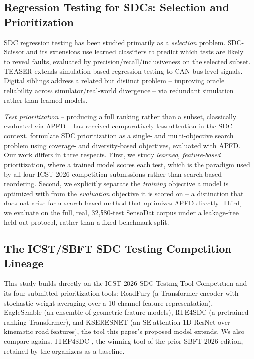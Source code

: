 \documentclass[smallextended]{svjour3}
\begin{document}
\subsection{Regression Testing for SDCs: Selection and Prioritization}
SDC regression testing has been studied primarily as a \emph{selection}
problem. SDC-Scissor \citep{birchler2022cost} and its extensions
\citep{birchler2023machine,khatiri2021machine} use learned classifiers to
predict which tests are likely to reveal faults, evaluated by
precision/recall/inclusiveness on the selected subset. TEASER
\citep{birchler2023teaser} extends simulation-based regression testing to
CAN-bus-level signals. Digital siblings \citep{biagiola2024two} address a
related but distinct problem -- improving oracle reliability across
simulator/real-world divergence -- via redundant simulation rather than
learned models.

\emph{Test prioritization} -- producing a full ranking rather than a subset,
classically evaluated via APFD \citep{rothermel2001prioritizing} -- has
received comparatively less attention in the SDC context. \citet{birchler2023single}
formulate SDC prioritization as a single- and multi-objective search
problem using coverage- and diversity-based objectives, evaluated with APFD.
Our work differs in three respects. First, we study \emph{learned,
feature-based} prioritization, where a trained model scores each test,
which is the paradigm used by all four ICST 2026 competition submissions
rather than search-based reordering. Second, we explicitly separate the
\emph{training} objective a model is optimized with from the
\emph{evaluation} objective it is scored on -- a distinction that does not
arise for a search-based method that optimizes APFD directly. Third, we
evaluate on the full, real, 32{,}580-test SensoDat corpus
\citep{birchler2024sensodat} under a leakage-free held-out protocol, rather
than a fixed benchmark split.

\subsection{The ICST/SBFT SDC Testing Competition Lineage}
This study builds directly on the ICST 2026 SDC Testing Tool Competition
\citep{aryan2026icst} and its four submitted prioritization tools:
RoadFury \citep{tran2026roadfury} (a Transformer encoder with stochastic
weight averaging over a 10-channel feature representation), EagleSemble
\citep{aquilinoeaglesemble} (an ensemble of geometric-feature models),
RTE4SDC \citep{maugeri2026rte4sdc} (a pretrained ranking Transformer), and
KSERESNET \citep{swain2026kseresnet} (an SE-attention 1D-ResNet over
kinematic road features), the tool this paper's proposed model extends. We
also compare against ITEP4SDC \citep{gullu2026itep4sdc}, the winning tool
of the prior SBFT 2026 edition, retained by the organizers as a baseline.
\end{document}

